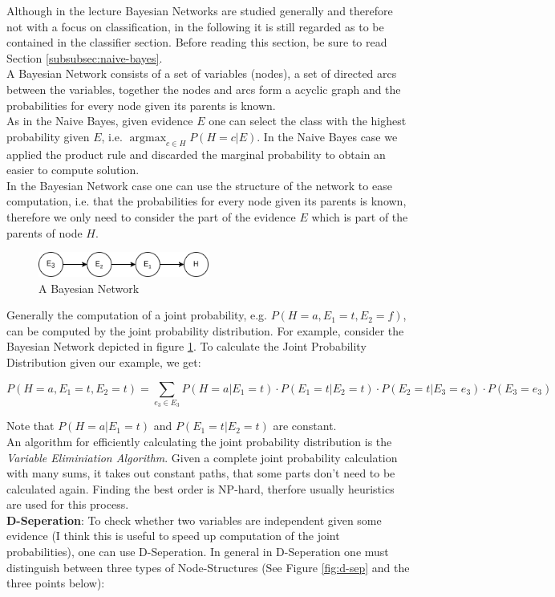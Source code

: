 \documentclass[12pt,a4paper]{article}
\DeclareMathOperator*{\argmax}{argmax}
\begin{document}
\noindent Although in the lecture Bayesian Networks are studied generally and therefore not with a focus on classification, in the following it is still regarded as to be contained in the classifier section. Before reading this section, be sure to read Section \ref{subsubsec:naive-bayes}.\\
A Bayesian Network consists of a set of variables (nodes), a set of directed arcs between the variables, together the nodes and arcs form a acyclic graph and the probabilities for every node given its parents is known.\\[1em]
As in the Naive Bayes, given evidence \(E\) one can select the class with the highest probability given \(E\), i.e. \(\argmax_{c \in H} P(H = c | E)\). In the Naive Bayes case we applied the product rule and discarded the marginal probability to obtain an easier to compute solution.\\
In the Bayesian Network case one can use the structure of the network to ease computation, i.e. that the probabilities for every node given its parents is known, therefore we only need to consider the part of the evidence \(E\) which is part of the parents of node \(H\).

\begin{figure}[ht]
    \begin{center}
    \includegraphics[width=0.5\textwidth]{imgs/bayesian-network.png}
    \caption{A Bayesian Network}
    \label{fig:bayesian-network}
    \end{center}
\end{figure}

Generally the computation of a joint probability, e.g. \(P(H = a, E_1 = t, E_2 = f)\), can be computed by the joint probability distribution. For example, consider the Bayesian Network depicted in figure \ref{fig:bayesian-network}. To calculate the Joint Probability Distribution given our example, we get:

\[P(H = a, E_1 = t, E_2 = t) = \sum_{e_3 \in E_3} P(H = a | E_1 = t) \cdot P(E_1 = t | E_2 = t) \cdot P(E_2 = t | E_3 = e_3) \cdot P(E_3 = e_3) \]

\noindent Note that \(P(H = a | E_1 = t)\) and \(P(E_1 = t | E_2 = t)\) are constant.\\
An algorithm for efficiently calculating the joint probability distribution is the \textit{Variable Eliminiation Algorithm}. Given a complete joint probability calculation with many sums, it takes out constant paths, that some parts don't need to be calculated again. Finding the best order is NP-hard, therfore usually heuristics are used for this process.\\[1em]
\textbf{D-Seperation}: To check whether two variables are independent given some evidence (I think this is useful to speed up computation of the joint probabilities), one can use D-Seperation. In general in D-Seperation one must distinguish between three types of Node-Structures (See Figure \ref{fig:d-sep} and the three points below):
\end{document}
